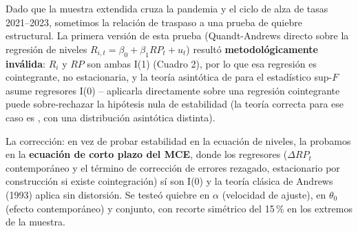 \documentclass[12pt, letterpaper]{article}
\begin{document}
Dado que la muestra extendida cruza la pandemia y el ciclo de alza de
tasas 2021--2023, sometimos la relación de traspaso a una prueba de
quiebre estructural. La primera versión de esta prueba (Quandt-Andrews
directo sobre la regresión de niveles $R_{i,t}=\beta_0+\beta_1 RP_t+u_t$)
resultó \textbf{metodológicamente inválida}: $R_i$ y $RP$ son ambas
I(1) (Cuadro 2), por lo que esa regresión es cointegrante, no
estacionaria, y la teoría asintótica de \textcite{andrews1993}
para el estadístico sup-$F$ asume regresores I(0) -- aplicarla
directamente sobre una regresión cointegrante puede sobre-rechazar
la hipótesis nula de estabilidad (la teoría correcta para ese caso es
\textcite{hansen1992}, con una distribución asintótica distinta).

La corrección: en vez de probar estabilidad en la ecuación de niveles,
la probamos en la \textbf{ecuación de corto plazo del MCE}, donde los
regresores ($\Delta RP_t$ contemporáneo y el término de corrección de
errores rezagado, estacionario por construcción si existe
cointegración) sí son I(0) y la teoría clásica de Andrews (1993) aplica
sin distorsión. Se testeó quiebre en $\alpha$ (velocidad de ajuste),
en $\theta_0$ (efecto contemporáneo) y conjunto, con recorte simétrico
del 15\,\% en los extremos de la muestra.
\end{document}
